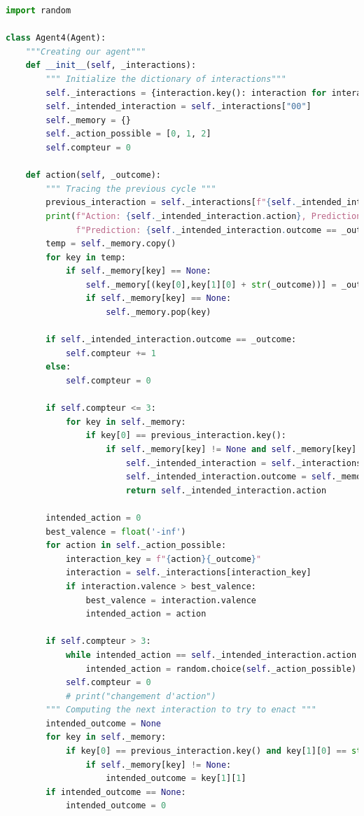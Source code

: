 \documentclass[a4paper, 12pt]{article}
\begin{document}
\begin{lstlisting}[language=Python]
import random

class Agent4(Agent):
    """Creating our agent"""
    def __init__(self, _interactions):
        """ Initialize the dictionary of interactions"""
        self._interactions = {interaction.key(): interaction for interaction in _interactions}
        self._intended_interaction = self._interactions["00"]
        self._memory = {}
        self._action_possible = [0, 1, 2]
        self.compteur = 0
        
    def action(self, _outcome):
        """ Tracing the previous cycle """
        previous_interaction = self._interactions[f"{self._intended_interaction.action}{_outcome}"]
        print(f"Action: {self._intended_interaction.action}, Prediction: {self._intended_interaction.outcome}, Outcome: {_outcome}, "
              f"Prediction: {self._intended_interaction.outcome == _outcome}, Valence: {previous_interaction.valence},")        
        temp = self._memory.copy()
        for key in temp:
            if self._memory[key] == None:
                self._memory[(key[0],key[1][0] + str(_outcome))] = _outcome
                if self._memory[key] == None:
                    self._memory.pop(key)
        
        if self._intended_interaction.outcome == _outcome:
            self.compteur += 1
        else:
            self.compteur = 0
        
        if self.compteur <= 3:
            for key in self._memory:
                if key[0] == previous_interaction.key():
                    if self._memory[key] != None and self._memory[key] > 0:
                        self._intended_interaction = self._interactions[key[1]]
                        self._intended_interaction.outcome = self._memory[key]
                        return self._intended_interaction.action
        
        intended_action = 0
        best_valence = float('-inf')
        for action in self._action_possible:
            interaction_key = f"{action}{_outcome}"
            interaction = self._interactions[interaction_key]
            if interaction.valence > best_valence:
                best_valence = interaction.valence
                intended_action = action
        
        if self.compteur > 3:
            while intended_action == self._intended_interaction.action:
                intended_action = random.choice(self._action_possible)
            self.compteur = 0
            # print("changement d'action")
        """ Computing the next interaction to try to enact """
        intended_outcome = None
        for key in self._memory:
            if key[0] == previous_interaction.key() and key[1][0] == str(intended_action):
                if self._memory[key] != None:
                    intended_outcome = key[1][1]
        if intended_outcome == None:
            intended_outcome = 0
        

\end{lstlisting}
\end{document}
